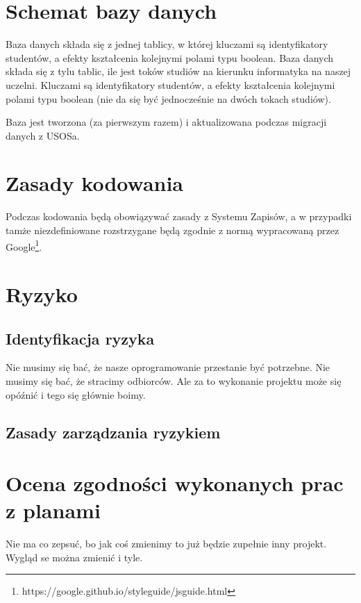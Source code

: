 \documentclass{article}
\begin{document}
\section{Schemat bazy danych}
Baza danych składa się z jednej tablicy, w której kluczami są identyfikatory studentów, a efekty kształcenia kolejnymi polami typu boolean.
Baza danych składa się z tylu tablic, ile jest toków studiów na kierunku informatyka na naszej uczelni. Kluczami są identyfikatory studentów, a efekty kształcenia kolejnymi polami typu boolean (nie da się być jednocześnie na dwóch tokach studiów).

Baza jest tworzona (za pierwszym razem) i aktualizowana podczas migracji danych z USOSa.



\section{Zasady kodowania}
Podczas kodowania będą obowiązywać zasady z Systemu Zapisów, a w przypadki tamże niezdefiniowane rozstrzygane będą zgodnie z normą wypracowaną przez Google\footnote{https://google.github.io/styleguide/jsguide.html}.



\section{Ryzyko}

\subsection{Identyfikacja ryzyka} %
Nie musimy się bać, że nasze oprogramowanie przestanie być potrzebne. Nie musimy się bać, że stracimy odbiorców. Ale za to wykonanie projektu może się opóźnić i tego się głównie boimy.

\subsection{Zasady zarządzania ryzykiem}



\section{Ocena zgodności wykonanych prac z planami}
Nie ma co zepsuć, bo jak coś zmienimy to już będzie zupełnie inny projekt. Wygląd se można zmienić i tyle.
\end{document}
